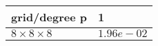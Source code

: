 \begin{tabular}{ll}
\hline
 grid/degree p         & 1          \\
\hline
 $8 \times 8 \times 8$ & $1.96e-02$ \\
\hline
\end{tabular}
